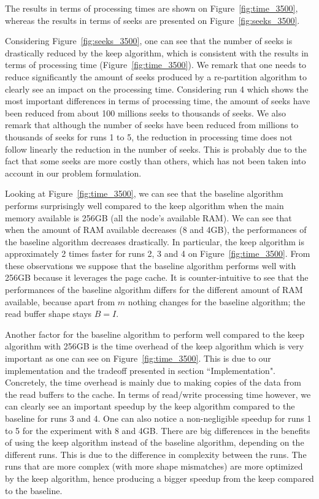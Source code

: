 \documentclass[sigconf, nonacm]{acmart}
\begin{document}
The results in terms of processing times are shown on
Figure~\ref{fig:time_3500}, whereas the results in terms of seeks are
presented on Figure~\ref{fig:seeks_3500}.

Considering Figure~\ref{fig:seeks_3500}, one can see that the number of
seeks is drastically reduced by the keep algorithm, which is consistent with
the results in terms of processing time (Figure~\ref{fig:time_3500}).
We remark that one needs to reduce significantly the amount of seeks produced
by a re-partition algorithm to clearly see an impact on the processing time.
Considering run 4 which shows the most important differences in terms of
processing time, the amount of seeks have been reduced from about 100 millions
seeks to thousands of seeks.
We also remark that although the number of seeks have been reduced from millions
to thousands of seeks for runs 1 to 5, the reduction in processing time does not
follow linearly the reduction in the number of seeks.
This is probably due to the fact that some seeks are more costly than others,
which has not been taken into account in our problem formulation.

Looking at Figure~\ref{fig:time_3500}, we can see that
the baseline algorithm performs surprisingly well compared to the keep algorithm
when the main memory available is 256GB (all the node's available RAM).
We can see that when the amount of RAM available decreases (8 and 4GB), the
performances of the baseline algorithm decreases drastically.
In particular, the keep algorithm is approximately 2 times faster for runs
2, 3 and 4 on Figure~\ref{fig:time_3500}.
From these observations we suppose that the baseline algorithm performs well
with 256GB because it leverages the page cache.
It is counter-intuitive to see that the performances of the baseline algorithm
differs for the different amount of RAM available, because apart from $m$
nothing changes for the baseline algorithm; the read buffer shape stays $B=I$.

Another factor for the baseline algorithm to perform well compared to the
keep algorithm with 256GB is the time overhead of the keep algorithm which is
very important as one can see on Figure~\ref{fig:time_3500}.
This is due to our implementation and the tradeoff presented in section
``Implementation".
Concretely, the time overhead is mainly due to making copies of the data from
the read buffers to the cache.
In terms of read/write processing time however, we can clearly see an
important speedup by the keep algorithm compared to the baseline for
runs 3 and 4.
One can also notice a non-negligible speedup for runs 1 to 5 for the experiment
with 8 and 4GB.
There are big differences in the benefits of using the keep algorithm instead of
the baseline algorithm, depending on the different runs.
This is due to the difference in complexity between the runs.
The runs that are more complex (with more shape mismatches) are more optimized
by the keep algorithm, hence producing a bigger speedup from the keep compared to
the baseline.
\end{document}
